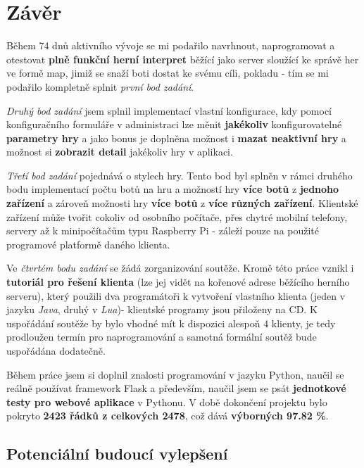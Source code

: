 \section*{Závěr}
\label{sec:ending}

{\sloppy
Během 74 dnů aktivního vývoje se mi podařilo navrhnout, naprogramovat a otestovat \textbf{plně funkční herní interpret} běžící jako server sloužící ke správě her ve formě map, jimiž se snaží boti dostat ke svému cíli, pokladu - tím se mi podařilo kompletně splnit \emph{první bod zadání}.

\emph{Druhý bod zadání} jsem splnil implementací vlastní konfigurace, kdy pomocí konfiguračního formuláře v administraci lze měnit \textbf{jakékoliv} konfigurovatelné \textbf{parametry hry} a jako bonus je doplněna možnost i \textbf{mazat neaktivní hry} a možnost si \textbf{zobrazit detail} jakékoliv hry v aplikaci.

\emph{Třetí bod zadání} pojednává o stylech hry. Tento bod byl splněn v rámci druhého bodu implementací počtu botů na hru a možností hry \textbf{více botů} z \textbf{jednoho zařízení} a zároveň možnosti hry \textbf{více botů} z \textbf{více různých zařízení}. Klientské zařízení může tvořit cokoliv od osobního počítače, přes chytré mobilní telefony, servery až k minipočítačům typu Raspberry Pi - záleží pouze na použité programové platformě daného klienta.

Ve \emph{čtvrtém bodu zadání} se žádá zorganizování soutěže. Kromě této práce vznikl i \textbf{tutoriál pro řešení klienta} (lze jej vidět na kořenové adrese běžícího herního serveru), který použili dva programátoři k vytvoření vlastního klienta (jeden v jazyku \emph{Java}, druhý v \emph{Lua})- klientské programy jsou přiloženy na CD. K uspořádání soutěže by bylo vhodné mít k dispozici alespoň 4 klienty, je tedy prodloužen termín pro naprogramování a samotná formální soutěž bude uspořádána dodatečně.

Během práce jsem si doplnil znalosti programování v jazyku Python, naučil se reálně používat framework Flask a především, naučil jsem se psát \textbf{jednotkové testy pro webové aplikace} v Pythonu. V době dokončení projektu bylo pokryto \textbf{2423 řádků z celkových 2478}, což dává \textbf{výborných 97.82 \%}.

\subsection*{Potenciální budoucí vylepšení}

}
